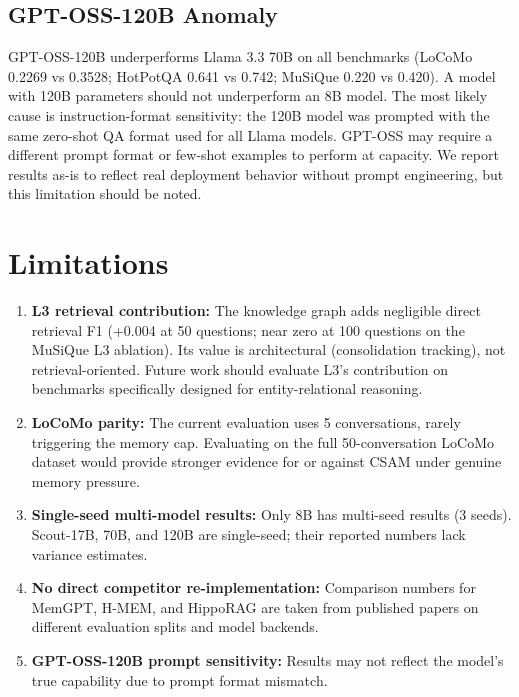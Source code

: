 \documentclass{article}
\begin{document}
\subsection{GPT-OSS-120B Anomaly}

GPT-OSS-120B underperforms Llama 3.3 70B on all benchmarks (LoCoMo
0.2269 vs 0.3528; HotPotQA 0.641 vs 0.742; MuSiQue 0.220 vs 0.420).
A model with 120B parameters should not underperform an 8B model.  The most
likely cause is instruction-format sensitivity: the 120B model was prompted
with the same zero-shot QA format used for all Llama models.  GPT-OSS may
require a different prompt format or few-shot examples to perform at capacity.
We report results as-is to reflect real deployment behavior without prompt
engineering, but this limitation should be noted.

\section{Limitations}
\label{sec:limitations}

\begin{enumerate}
\item \textbf{L3 retrieval contribution:}  The knowledge graph adds negligible
      direct retrieval F1 (+0.004 at 50 questions; near zero at 100 questions
      on the MuSiQue L3 ablation).  Its value is architectural (consolidation
      tracking), not retrieval-oriented.  Future work should evaluate L3's
      contribution on benchmarks specifically designed for entity-relational
      reasoning.
\item \textbf{LoCoMo parity:}  The current evaluation uses 5 conversations,
      rarely triggering the memory cap.  Evaluating on the full 50-conversation
      LoCoMo dataset would provide stronger evidence for or against CSAM under
      genuine memory pressure.
\item \textbf{Single-seed multi-model results:}  Only 8B has multi-seed results
      (3 seeds).  Scout-17B, 70B, and 120B are single-seed; their reported
      numbers lack variance estimates.
\item \textbf{No direct competitor re-implementation:}  Comparison numbers for
      MemGPT, H-MEM, and HippoRAG are taken from published papers on different
      evaluation splits and model backends.
\item \textbf{GPT-OSS-120B prompt sensitivity:}  Results may not reflect the
      model's true capability due to prompt format mismatch.
\end{enumerate}
\end{document}
